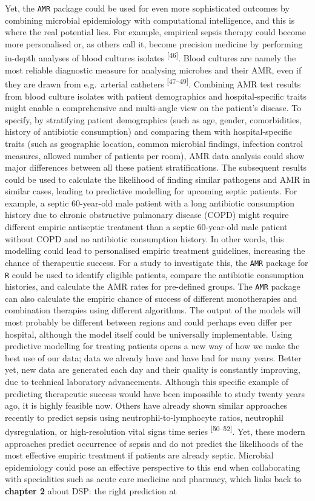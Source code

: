 \documentclass[
]{book}
\begin{document}
Yet, the \texttt{AMR} package could be used for even more sophisticated outcomes by combining microbial epidemiology with computational intelligence, and this is where the real potential lies. For example, empirical sepsis therapy could become more personalised or, as others call it, become precision medicine by performing in-depth analyses of blood cultures isolates \textsuperscript{{[}46{]}}. Blood cultures are namely the most reliable diagnostic measure for analysing microbes and their AMR, even if they are drawn from e.g.~arterial catheters \textsuperscript{{[}47--49{]}}. Combining AMR test results from blood culture isolates with patient demographics and hospital-specific traits might enable a comprehensive and multi-angle view on the patient's disease. To specify, by stratifying patient demographics (such as age, gender, comorbidities, history of antibiotic consumption) and comparing them with hospital-specific traits (such as geographic location, common microbial findings, infection control measures, allowed number of patients per room), AMR data analysis could show major differences between all these patient stratifications. The subsequent results could be used to calculate the likelihood of finding similar pathogens and AMR in similar cases, leading to predictive modelling for upcoming septic patients. For example, a septic 60-year-old male patient with a long antibiotic consumption history due to chronic obstructive pulmonary disease (COPD) might require different empiric antiseptic treatment than a septic 60-year-old male patient without COPD and no antibiotic consumption history. In other words, this modelling could lead to personalised empiric treatment guidelines, increasing the chance of therapeutic success. For a study to investigate this, the \texttt{AMR} package for \texttt{R} could be used to identify eligible patients, compare the antibiotic consumption histories, and calculate the AMR rates for pre-defined groups. The \texttt{AMR} package can also calculate the empiric chance of success of different monotherapies and combination therapies using different algorithms. The output of the models will most probably be different between regions and could perhaps even differ per hospital, although the model itself could be universally implementable. Using predictive modelling for treating patients opens a new way of how we make the best use of our data; data we already have and have had for many years. Better yet, new data are generated each day and their quality is constantly improving, due to technical laboratory advancements. Although this specific example of predicting therapeutic success would have been impossible to study twenty years ago, it is highly feasible now. Others have already shown similar approaches recently to predict sepsis using neutrophil-to-lymphocyte ratios, neutrophil dysregulation, or high-resolution vital signs time series \textsuperscript{{[}50--52{]}}. Yet, these modern approaches predict occurrence of sepsis and do not predict the likelihoods of the most effective empiric treatment if patients are already septic. Microbial epidemiology could pose an effective perspective to this end when collaborating with specialities such as acute care medicine and pharmacy, which links back to \textbf{chapter 2} about DSP: the right prediction at 
\end{document}
